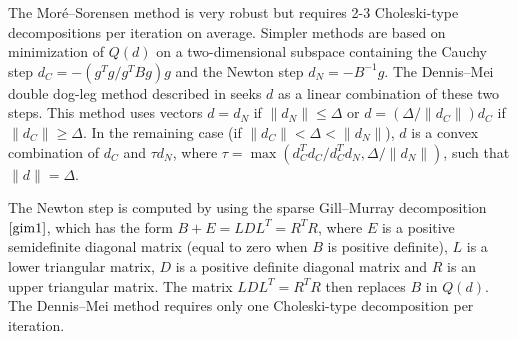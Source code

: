 \documentclass{esub2acm}
\begin{document}
\vspace{5mm}


\vspace{3mm}

\noindent The Mor\'{e}--Sorensen method is very robust but requires
2-3 Choleski-type decompositions per iteration on average. Simpler
methods are based on minimization of $Q(d)$ on a two-dimensional
subspace containing the Cauchy step $d_C = - (g^Tg/g^TBg) g$ and the
Newton step $d_N = - B^{-1} g$. The Dennis--Mei double dog-leg method
described in \cite{dem1} seeks $d$ as a linear combination of these
two steps. This method uses vectors $d = d_N$ if $\|d_N\| \leq \Delta$
or $d = (\Delta /\|d_C\|) d_C$ if $\| d_C \| \geq \Delta$. In the
remaining case (if $\| d_C \| < \Delta <  \|d_N\|$), $d$ is
a convex combination of $d_C$ and $\tau d_N$, where
$\tau = \max(d_C^Td_C/d_C^Td_N, \Delta/\|d_N\|)$, such that
$\|d\| = \Delta$.

The Newton step is computed by using
the sparse Gill--Murray decomposition $\cite{gim1}$, which
has the form $B + E = L D L^T = R^T R$,
where $E$ is a positive semidefinite diagonal matrix
(equal to zero when $B$ is positive definite), $L$ is
a lower triangular matrix, $D$ is a positive definite diagonal
matrix and $R$ is an upper triangular matrix. The matrix $L D L^T = R^T R$
then replaces $B$ in $Q(d)$. The Dennis--Mei
method requires only one Choleski-type decomposition per iteration.

\vspace{5mm}


\vspace{3mm}
\end{document}
